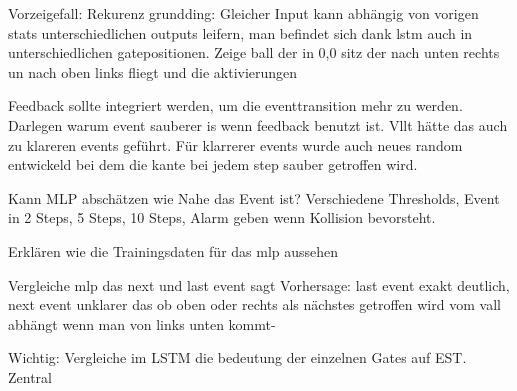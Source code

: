 Vorzeigefall: Rekurenz grundding: Gleicher Input kann abhängig von vorigen stats unterschiedlichen outputs leifern, man befindet sich dank lstm auch in unterschiedlichen gatepositionen.
Zeige ball der in 0,0 sitz der nach unten rechts un nach oben links fliegt und die aktivierungen

Feedback sollte integriert werden, um die eventtransition mehr zu werden. Darlegen warum event sauberer is wenn feedback benutzt ist. Vllt hätte das auch zu klareren events geführt. Für klarrerer events wurde auch neues random entwickeld bei dem die kante bei jedem step sauber getroffen wird.

Kann MLP abschätzen wie Nahe das Event ist?
Verschiedene Thresholds, Event in 2 Steps, 5 Steps, 10 Steps, Alarm geben wenn Kollision bevorsteht.

Erklären wie die Trainingsdaten für das mlp aussehen

Vergleiche mlp das next und last event sagt
Vorhersage: last event exakt deutlich, next event unklarer das ob oben oder rechts als nächstes getroffen wird vom vall abhängt wenn man von links unten kommt-

Wichtig:
Vergleiche im LSTM die bedeutung der einzelnen Gates auf EST. Zentral
